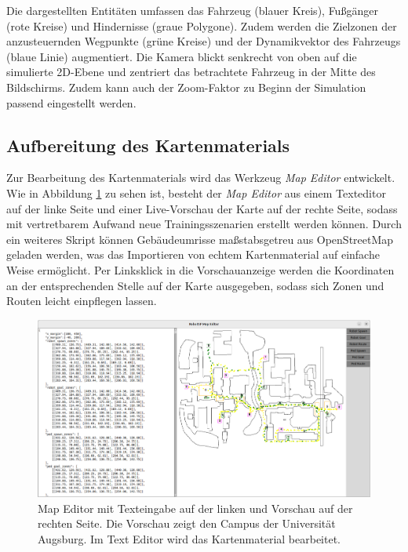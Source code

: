 Die dargestellten Entitäten umfassen das Fahrzeug (blauer Kreis), Fußgänger (rote Kreise)
und Hindernisse (graue Polygone). Zudem werden die Zielzonen der anzusteuernden
Wegpunkte (grüne Kreise) und der Dynamikvektor des Fahrzeugs (blaue Linie)
augmentiert. Die Kamera blickt senkrecht von oben auf die simulierte 2D-Ebene
und zentriert das betrachtete Fahrzeug in der Mitte des Bildschirms. Zudem kann
auch der Zoom-Faktor zu Beginn der Simulation passend eingestellt werden.\\

\subsection{Aufbereitung des Kartenmaterials}
Zur Bearbeitung des Kartenmaterials wird das Werkzeug \emph{Map Editor} entwickelt.
Wie in Abbildung \ref{fig:MapEditor} zu sehen ist, besteht der \emph{Map Editor} aus einem
Texteditor auf der linke Seite und einer Live-Vorschau der Karte auf der rechte Seite,
sodass mit vertretbarem Aufwand neue Trainingsszenarien erstellt werden können. Durch ein
weiteres Skript können Gebäudeumrisse maßstabsgetreu aus OpenStreetMap geladen werden,
was das Importieren von echtem Kartenmaterial auf einfache Weise ermöglicht. Per Linksklick
in die Vorschauanzeige werden die Koordinaten an der entsprechenden Stelle auf der Karte
ausgegeben, sodass sich Zonen und Routen leicht einpflegen lassen.\\

\begin{figure}[h]
  \centering
  \includegraphics[width = 1.0\textwidth]{imgs/map_editor}
  \caption{Map Editor mit Texteingabe auf der linken und Vorschau auf der rechten Seite.
           Die Vorschau zeigt den Campus der Universität Augsburg. Im Text Editor
           wird das Kartenmaterial bearbeitet.}
  \label{fig:MapEditor}
\end{figure}


